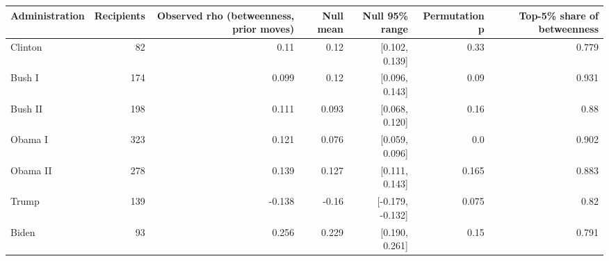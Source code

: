 \begin{tabular}{lrrrrrr}
\toprule
Administration & Recipients & Observed rho (betweenness, prior moves) & Null mean & Null 95\% range & Permutation p & Top-5\% share of betweenness \\
\midrule
Clinton & 82 & 0.11 & 0.12 & [0.102, 0.139] & 0.33 & 0.779 \\
Bush I & 174 & 0.099 & 0.12 & [0.096, 0.143] & 0.09 & 0.931 \\
Bush II & 198 & 0.111 & 0.093 & [0.068, 0.120] & 0.16 & 0.88 \\
Obama I & 323 & 0.121 & 0.076 & [0.059, 0.096] & 0.0 & 0.902 \\
Obama II & 278 & 0.139 & 0.127 & [0.111, 0.143] & 0.165 & 0.883 \\
Trump & 139 & -0.138 & -0.16 & [-0.179, -0.132] & 0.075 & 0.82 \\
Biden & 93 & 0.256 & 0.229 & [0.190, 0.261] & 0.15 & 0.791 \\
\bottomrule
\end{tabular}
\par{}
